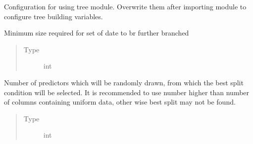 \documentclass[letterpaper,10pt,english]{sphinxmanual}
\begin{document}

\begin{fulllineitems}
\label{\detokenize{tree:random_forest.tree.Config}}
Configuration for using tree module.
Overwrite them after importing module to configure tree building variables.

\begin{fulllineitems}
\label{\detokenize{tree:random_forest.tree.Config.min_split_size}}
Minimum size required for set of date to br further branched
\begin{quote}\begin{description}
\item[{Type}] \leavevmode
int

\end{description}\end{quote}

\end{fulllineitems}


\begin{fulllineitems}
\label{\detokenize{tree:random_forest.tree.Config.number_of_predictors_to_draw}}
Number of predictors which will be randomly drawn, from which the best split condition will be selected. It is recommended to use number higher than number of columns containing uniform data,
other wise best split may not be found.
\begin{quote}\begin{description}
\item[{Type}] \leavevmode
int

\end{description}\end{quote}

\end{fulllineitems}


\end{fulllineitems}
\end{document}
